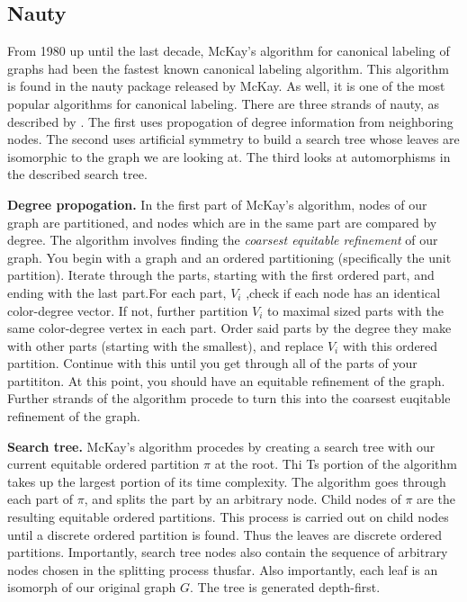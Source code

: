 \subsection{Nauty}
From 1980 up until the last decade, McKay's algorithm for canonical labeling of graphs \cite{mckay81} had been the fastest known canonical labeling algorithm. This algorithm is found in the nauty package released by McKay. As well, it is one of the most popular algorithms for canonical labeling. There are three strands of nauty, as described by \cite{hartke09}. The first uses propogation of degree information from neighboring nodes. The second uses artificial symmetry to build a search tree whose leaves are isomorphic to the graph we are looking at. The third 
looks at automorphisms in the described search tree. 

\textbf{Degree propogation.} In the first part of McKay's algorithm, nodes of our graph are partitioned, and nodes which are in the same part are compared by degree. The algorithm involves finding the \textit{coarsest equitable refinement} of our graph. 
You begin with a graph and an ordered partitioning (specifically the unit partition). Iterate through the parts, starting with the first ordered part, and ending with the last part.For each part, $V_i$ ,check if each node has an identical color-degree vector. If not, further partition $V_i$ to maximal sized parts with the same color-degree vertex in each part. Order said parts by the degree they make with other parts (starting with the smallest), and replace $V_i$ with this ordered partition. Continue with this until you get through all of the parts of your partititon. At this point, you should have an equitable refinement of the graph. Further strands of the algorithm procede to turn this into the coarsest euqitable refinement of the graph. 

\textbf{Search tree.} McKay's algorithm procedes by creating a search tree with our current equitable ordered partition $\pi$ at the root. Thi Ts portion of the algorithm takes up the largest portion of its time complexity\cite{darga04}. The algorithm goes through each part of $\pi$, and splits the part by an arbitrary node. Child nodes of $\pi$ are the resulting equitable ordered partitions. This process is carried out on child nodes until a discrete ordered partition is found. Thus the leaves are discrete ordered partitions. Importantly, search tree nodes also contain the sequence of arbitrary nodes chosen in the splitting process thusfar. Also importantly, each leaf is an isomorph of our original graph $G$. The tree is generated depth-first.

